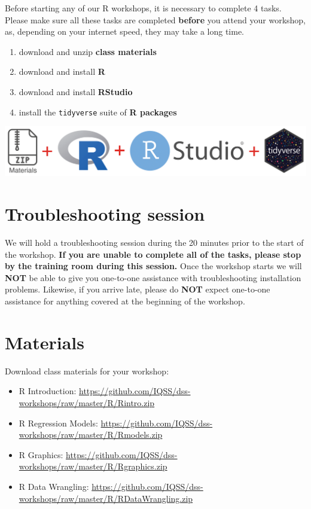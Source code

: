 \documentclass[
]{book}
\providecommand{\tightlist}{%
  \setlength{\itemsep}{0pt}\setlength{\parskip}{0pt}}
\begin{document}
Before starting any of our R workshops, it is necessary to complete 4 tasks. Please make sure all these tasks are completed \textbf{before} you attend your workshop, as, depending on your internet speed, they may take a long time.

\begin{enumerate}
\def\labelenumi{\arabic{enumi}.}
\tightlist
\item
  download and unzip \textbf{class materials}
\item
  download and install \textbf{R}
\item
  download and install \textbf{RStudio}
\item
  install the \texttt{tidyverse} suite of \textbf{R packages}
\end{enumerate}

\includegraphics{R/Rinstall/images/install_software_R.png}

\hypertarget{troubleshooting-session}{%
\section{Troubleshooting session}\label{troubleshooting-session}}

We will hold a troubleshooting session during the 20 minutes prior to the start of the workshop.
\textbf{If you are unable to complete all of the tasks, please stop by the training room during this session.}
Once the workshop starts we will \textbf{NOT} be able to give you one-to-one assistance with troubleshooting installation problems. Likewise, if you arrive late, please do \textbf{NOT} expect one-to-one assistance for anything covered at the beginning of the workshop.

\hypertarget{materials}{%
\section{Materials}\label{materials}}

Download class materials for your workshop:

\begin{itemize}
\tightlist
\item
  R Introduction: \url{https://github.com/IQSS/dss-workshops/raw/master/R/Rintro.zip}
\item
  R Regression Models: \url{https://github.com/IQSS/dss-workshops/raw/master/R/Rmodels.zip}
\item
  R Graphics: \url{https://github.com/IQSS/dss-workshops/raw/master/R/Rgraphics.zip}
\item
  R Data Wrangling: \url{https://github.com/IQSS/dss-workshops/raw/master/R/RDataWrangling.zip}
\end{itemize}
\end{document}
